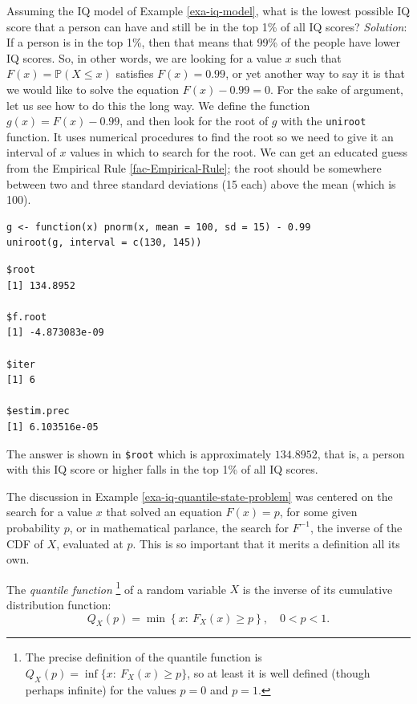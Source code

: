 \documentclass[captions=tableheading]{scrbook}
\begin{document}
\begin{example}
Assuming the IQ model of Example \ref{exa-iq-model}, what is the lowest possible IQ score that a person can have and still be in the top 1\% of all IQ scores?
\emph{Solution}: If a person is in the top 1\%, then that means that 99\% of the people have lower IQ scores. So, in other words, we are looking for a value \(x\) such that \(F(x)=\mathbb{P}(X\leq x)\) satisfies \(F(x)=0.99\), or yet another way to say it is that we would like to solve the equation \(F(x)-0.99=0\). For the sake of argument, let us see how to do this the long way. We define the function \(g(x)=F(x)-0.99\), and then look for the root of \(g\) with the \texttt{uniroot} function. It uses numerical procedures to find the root so we need to give it an interval of \(x\) values in which to search for the root. We can get an educated guess from the Empirical Rule \ref{fac-Empirical-Rule}; the root should be somewhere between two and three standard deviations (15 each) above the mean (which is 100).

\lstset{language=R}
\begin{lstlisting}
g <- function(x) pnorm(x, mean = 100, sd = 15) - 0.99
uniroot(g, interval = c(130, 145))
\end{lstlisting}


\begin{verbatim}
$root
[1] 134.8952

$f.root
[1] -4.873083e-09

$iter
[1] 6

$estim.prec
[1] 6.103516e-05
\end{verbatim}



The answer is shown in \texttt{\$root} which is approximately \(  134.8952 \), that is, a person with this IQ score or higher falls in the top 1\% of all IQ scores.
\end{example}

The discussion in Example \ref{exa-iq-quantile-state-problem} was centered on the search for a value \(x\) that solved an equation \(F(x)=p\), for some given probability \(p\), or in mathematical parlance, the search for \(F^{-1}\), the inverse of the CDF of \(X\), evaluated at \(p\). This is so important that it merits a definition all its own.

\begin{defn}
The \emph{quantile function}
\footnote{The precise definition of the quantile function is \(Q_{X}(p)=\inf \{ x:\ F_{X}(x)\geq p \}\), so at least it is well defined (though perhaps infinite) for the values \(p=0\) and \(p=1\).}
of a random variable \(X\) is the inverse of its cumulative distribution function:
\begin{equation}
Q_{X}(p)=\min\left\{ x:\ F_{X}(x)\geq p\right\} ,\quad 0 < p <1.
\end{equation}
\end{defn}
\end{document}
